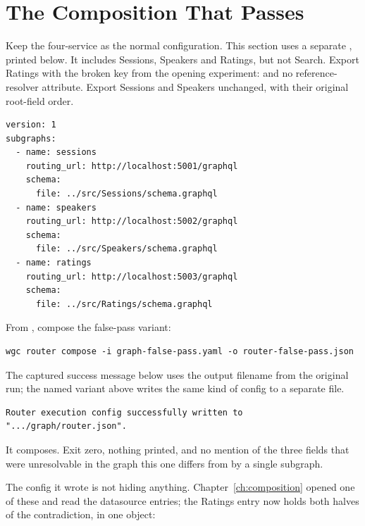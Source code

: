 \section{The Composition That Passes}
\label{sec:ch15-the-composition-that-passes}

%
Keep the four-service  as the normal configuration. This
section uses a separate , printed below.
It includes Sessions, Speakers and Ratings, but not Search. Export Ratings
with the broken key from the opening experiment: 
and no reference-resolver attribute. Export Sessions and Speakers unchanged,
with their original root-field order.

\begin{verbatim}
version: 1
subgraphs:
  - name: sessions
    routing_url: http://localhost:5001/graphql
    schema:
      file: ../src/Sessions/schema.graphql
  - name: speakers
    routing_url: http://localhost:5002/graphql
    schema:
      file: ../src/Speakers/schema.graphql
  - name: ratings
    routing_url: http://localhost:5003/graphql
    schema:
      file: ../src/Ratings/schema.graphql
\end{verbatim}

From , compose the false-pass variant:

\begin{verbatim}
wgc router compose -i graph-false-pass.yaml -o router-false-pass.json
\end{verbatim}

The captured success message below uses the output filename from the original
run; the named variant above writes the same kind of config to a separate file.

\begin{verbatim}
Router execution config successfully written to ".../graph/router.json".
\end{verbatim}

%
It composes. Exit zero, nothing printed, and no mention of the three fields
that were unresolvable in the graph this one differs from by a single
subgraph.

%
The config it wrote is not hiding anything. Chapter~\ref{ch:composition} opened
one of these and read the datasource entries; the Ratings entry now holds both
halves of the contradiction, in one object:

